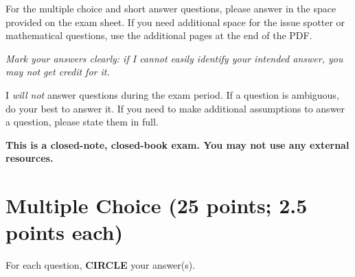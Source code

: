 \documentclass[12pt]{article}
\begin{document}
For the multiple choice and short answer questions, please answer in the space provided on the exam sheet.  If you need additional space for the issue spotter or mathematical questions, use the additional pages at the end of the PDF.

\emph{Mark your answers clearly: if I cannot easily identify your intended answer, you may not get credit for it.}

I \emph{will not} answer questions during the exam period. If a question is ambiguous, do your best to answer it. If you need to make additional assumptions to answer a question, please state them in full.

\begin{center}
    \bf This is a closed-note, closed-book exam. You may not use any external resources.
\end{center}

\clearpage

\section*{Multiple Choice (25 points; 2.5 points each)}

For each question, \textbf{CIRCLE} your answer(s).
\end{document}
